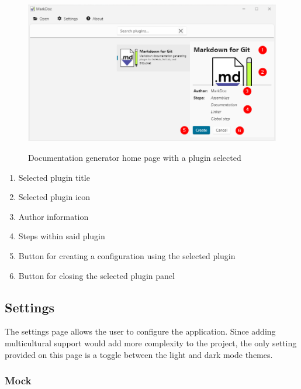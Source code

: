 \begin{figure}[H]
    \includegraphics[width=\linewidth]{img/markDocPluginSelected.png}
    \label{fig:homePagePluginSelected}
    \caption{Documentation generator home page with a plugin selected}
\end{figure}

\begin{enumerate}
    \item Selected plugin title
    \item Selected plugin icon
    \item Author information
    \item Steps within said plugin
    \item Button for creating a configuration using the selected plugin
    \item Button for closing the selected plugin panel
\end{enumerate}

\subsection{Settings}

The settings page allows the user to configure the application. Since adding multicultural support would add more complexity to the project, the only setting provided on this page is a toggle between the light and dark mode themes.

\subsubsection{Mock}

